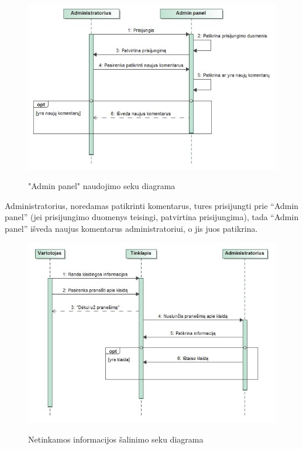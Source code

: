 ﻿\documentclass{VUMIFPSkursinis}
\begin{document}
\begin{figure}[H]
    \centering
    \includegraphics[scale=0.7]{img/geri/_adminNaujiCom}
    \label{img:uml21}
	\caption{"Admin panel" naudojimo seku diagrama}
\end{figure}

Administratorius, noredamas patikrinti komentarus, tures prisijungti prie “Admin panel” (jei prisijungimo duomenys teisingi, patvirtina prisijungima), tada “Admin panel” išveda naujus komentarus administratoriui, o jis juos patikrina.

\begin{figure}[H]
    \centering
    \includegraphics[scale=0.7]{img/geri/_adminError}
    \label{img:uml22}
	\caption{Netinkamos informacijos šalinimo seku diagrama}
\end{figure}
\end{document}
